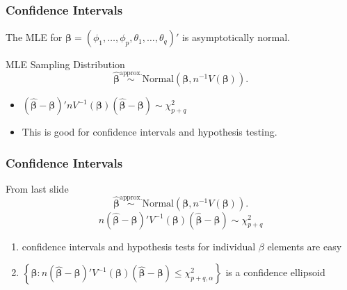 \documentclass{beamer}
\begin{document}

\begin{frame}
\frametitle{Confidence Intervals}

The MLE for $\bm{\beta} = (\phi_1,\ldots,\phi_p,\theta_1,\ldots,\theta_q)' $ is asymptotically normal.
\begin{block}{MLE Sampling Distribution}
\[
\hat{\bm{\beta}} \overset{\text{approx.}}{\sim} \text{Normal}(\bm{\beta}, n^{-1}V(\bm{\beta})).
\]
\end{block}
\begin{itemize}
\item $ (\hat{\bm{\beta}} - \bm{\beta})'n V^{-1} (\bm{\beta})(\hat{\bm{\beta}} - \bm{\beta}) \sim \chi^2_{p+q}$
\item This is good for confidence intervals and hypothesis testing.
\end{itemize}
\end{frame}


\begin{frame}
\frametitle{Confidence Intervals}

\begin{block}{From last slide}
\[
\hat{\bm{\beta}} \overset{\text{approx.}}{\sim} \text{Normal}(\bm{\beta}, n^{-1}V(\bm{\beta})).
\]
\[
n(\hat{\bm{\beta}} - \bm{\beta})'V^{-1} (\bm{\beta})(\hat{\bm{\beta}} - \bm{\beta}) \sim \chi^2_{p+q}
\]
\end{block}


\begin{enumerate}
\item confidence intervals and hypothesis tests for individual $\beta$ elements are easy
\item $\left\{ \bm{\beta} : n (\hat{\bm{\beta}} - \bm{\beta})' V^{-1} (\bm{\beta})(\hat{\bm{\beta}} - \bm{\beta}) \le \chi^2_{p+q,\alpha} \right\}$ is a confidence ellipsoid
\end{enumerate}

\end{frame}

\end{document}
